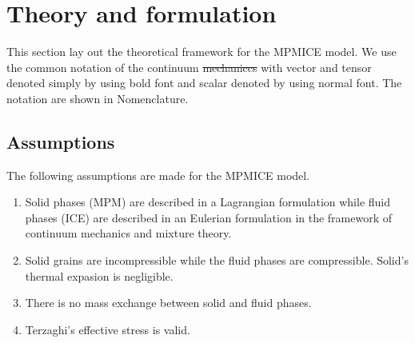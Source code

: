 \documentclass[preprint,12pt]{elsarticle}
\providecommand{\DIFadd}[1]{{\protect\color{blue}\uwave{#1}}} %
\providecommand{\DIFdel}[1]{{\protect\color{red}\sout{#1}}}                      %
\providecommand{\DIFaddbegin}{} %
\providecommand{\DIFaddend}{} %
\providecommand{\DIFdelbegin}{} %
\providecommand{\DIFdelend}{} %
\newcommand{\DIFscaledelfig}{0.5}
\newlength{\DIFdelgraphicswidth} %
\newlength{\DIFdelgraphicsheight} %
\newcommand{\DIFaddincludegraphics}[2][]{{\color{blue}\fbox{\DIFOincludegraphics[#1]{#2}}}} %
\newcommand{\DIFdelincludegraphics}[2][]{%
\sbox{\DIFdelgraphicsbox}{\DIFOincludegraphics[#1]{#2}}%
\settoboxwidth{\DIFdelgraphicswidth}{\DIFdelgraphicsbox} %
\settoboxtotalheight{\DIFdelgraphicsheight}{\DIFdelgraphicsbox} %
\scalebox{\DIFscaledelfig}{%
\parbox[b]{\DIFdelgraphicswidth}{\usebox{\DIFdelgraphicsbox}\\[-\baselineskip] \rule{\DIFdelgraphicswidth}{0em}}\llap{\resizebox{\DIFdelgraphicswidth}{\DIFdelgraphicsheight}{%
\setlength{\unitlength}{\DIFdelgraphicswidth}%
\begin{picture}(1,1)%
\thicklines\linethickness{2pt} %
{\color[rgb]{1,0,0}\put(0,0){\framebox(1,1){}}}%
{\color[rgb]{1,0,0}\put(0,0){\line( 1,1){1}}}%
{\color[rgb]{1,0,0}\put(0,1){\line(1,-1){1}}}%
\end{picture}%
}\hspace*{3pt}}} %
} %
\DeclareRobustCommand{\DIFaddbegin}{\DIFOaddbegin \let\includegraphics\DIFaddincludegraphics} %
\DeclareRobustCommand{\DIFaddend}{\DIFOaddend \let\includegraphics\DIFOincludegraphics} %
\DeclareRobustCommand{\DIFdelbegin}{\DIFOdelbegin \let\includegraphics\DIFdelincludegraphics} %
\DeclareRobustCommand{\DIFdelend}{\DIFOaddend \let\includegraphics\DIFOincludegraphics} %
\begin{document}
\section{\textsf{Theory and formulation}}
This section lay out the theoretical framework for the MPMICE model. We use the common notation of the continuum \DIFdelbegin \DIFdel{mechaniccs }\DIFdelend \DIFaddbegin \DIFadd{mechanics }\DIFaddend with vector and tensor denoted simply by using bold font and scalar denoted by using normal font. The notation are shown in Nomenclature.
\subsection{\textsf{Assumptions}}
The following assumptions are made for the MPMICE model.
\begin{enumerate}
\item Solid phases (MPM) are described in a Lagrangian formulation while fluid phases (ICE) are described in an Eulerian formulation in the framework of continuum mechanics and mixture theory.
\item Solid grains are incompressible while the fluid phases are compressible. Solid's thermal expasion is negligible.
\item There is no mass exchange between solid and fluid phases.
\item Terzaghi's effective stress is valid. 
\end {enumerate}
%
%
\end{document}
